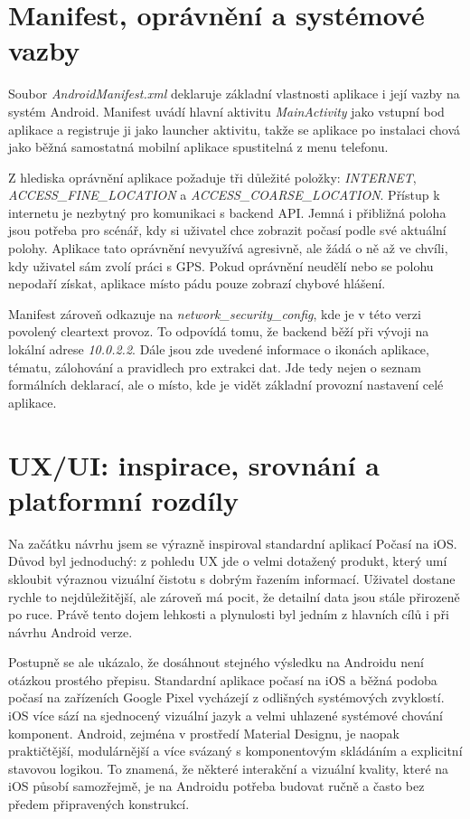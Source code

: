 \documentclass[12pt,a4paper]{article}
\begin{document}
\section{Manifest, oprávnění a systémové vazby}
Soubor \textit{AndroidManifest.xml} deklaruje základní vlastnosti aplikace i její vazby na systém Android. Manifest uvádí hlavní aktivitu \textit{MainActivity} jako vstupní bod aplikace a registruje ji jako launcher aktivitu, takže se aplikace po instalaci chová jako běžná samostatná mobilní aplikace spustitelná z menu telefonu.

Z hlediska oprávnění aplikace požaduje tři důležité položky: \textit{INTERNET}, \textit{ACCESS\_FINE\_LOCATION} a \textit{ACCESS\_COARSE\_LOCATION}. Přístup k internetu je nezbytný pro komunikaci s backend API. Jemná i přibližná poloha jsou potřeba pro scénář, kdy si uživatel chce zobrazit počasí podle své aktuální polohy. Aplikace tato oprávnění nevyužívá agresivně, ale žádá o ně až ve chvíli, kdy uživatel sám zvolí práci s GPS. Pokud oprávnění neudělí nebo se polohu nepodaří získat, aplikace místo pádu pouze zobrazí chybové hlášení.

Manifest zároveň odkazuje na \textit{network\_security\_config}, kde je v této verzi povolený cleartext provoz. To odpovídá tomu, že backend běží při vývoji na lokální adrese \textit{10.0.2.2}. Dále jsou zde uvedené informace o ikonách aplikace, tématu, zálohování a pravidlech pro extrakci dat. Jde tedy nejen o seznam formálních deklarací, ale o místo, kde je vidět základní provozní nastavení celé aplikace.

\section{UX/UI: inspirace, srovnání a platformní rozdíly}
Na začátku návrhu jsem se výrazně inspiroval standardní aplikací Počasí na iOS. Důvod byl jednoduchý: z pohledu UX jde o velmi dotažený produkt, který umí skloubit výraznou vizuální čistotu s dobrým řazením informací. Uživatel dostane rychle to nejdůležitější, ale zároveň má pocit, že detailní data jsou stále přirozeně po ruce. Právě tento dojem lehkosti a plynulosti byl jedním z hlavních cílů i při návrhu Android verze.

Postupně se ale ukázalo, že dosáhnout stejného výsledku na Androidu není otázkou prostého přepisu. Standardní aplikace počasí na iOS a běžná podoba počasí na zařízeních Google Pixel vycházejí z odlišných systémových zvyklostí. iOS více sází na sjednocený vizuální jazyk a velmi uhlazené systémové chování komponent. Android, zejména v prostředí Material Designu, je naopak praktičtější, modulárnější a více svázaný s komponentovým skládáním a explicitní stavovou logikou. To znamená, že některé interakční a vizuální kvality, které na iOS působí samozřejmě, je na Androidu potřeba budovat ručně a často bez předem připravených konstrukcí.
\end{document}
